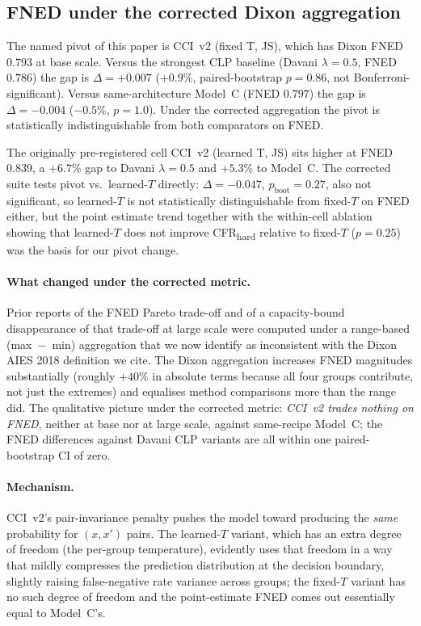 \documentclass[10pt,a4paper]{article}
\begin{document}
\subsection{FNED under the corrected Dixon aggregation}
\label{sec:disc_fned}

The named pivot of this paper is CCI~v2 (fixed T, JS), which has Dixon FNED $0.793$ at base scale. Versus the strongest CLP baseline (Davani $\lambda{=}0.5$, FNED $0.786$) the gap is $\Delta = +0.007$ ($+0.9\%$, paired-bootstrap $p = 0.86$, not Bonferroni-significant). Versus same-architecture Model~C (FNED $0.797$) the gap is $\Delta = -0.004$ ($-0.5\%$, $p = 1.0$). Under the corrected aggregation the pivot is statistically indistinguishable from both comparators on FNED.

The originally pre-registered cell CCI~v2 (learned T, JS) sits higher at FNED $0.839$, a $+6.7\%$ gap to Davani $\lambda=0.5$ and $+5.3\%$ to Model~C. The corrected suite tests pivot vs.\ learned-$T$ directly: $\Delta = -0.047$, $p_{\text{boot}} = 0.27$, also not significant, so learned-$T$ is not statistically distinguishable from fixed-$T$ on FNED either, but the point estimate trend together with the within-cell ablation showing that learned-$T$ does not improve CFR\textsubscript{hard} relative to fixed-$T$ ($p = 0.25$) was the basis for our pivot change.

\paragraph{What changed under the corrected metric.}
Prior reports of the FNED Pareto trade-off and of a capacity-bound disappearance of that trade-off at large scale were computed under a range-based (max~$-$~min) aggregation that we now identify as inconsistent with the Dixon AIES 2018 definition we cite. The Dixon aggregation increases FNED magnitudes substantially (roughly $+40\%$ in absolute terms because all four groups contribute, not just the extremes) and equalises method comparisons more than the range did. The qualitative picture under the corrected metric: \emph{CCI~v2 trades nothing on FNED}, neither at base nor at large scale, against same-recipe Model~C; the FNED differences against Davani CLP variants are all within one paired-bootstrap CI of zero.

\paragraph{Mechanism.}
CCI~v2's pair-invariance penalty pushes the model toward producing the \emph{same} probability for $(x, x')$ pairs. The learned-$T$ variant, which has an extra degree of freedom (the per-group temperature), evidently uses that freedom in a way that mildly compresses the prediction distribution at the decision boundary, slightly raising false-negative rate variance across groups; the fixed-$T$ variant has no such degree of freedom and the point-estimate FNED comes out essentially equal to Model~C's.
\end{document}
